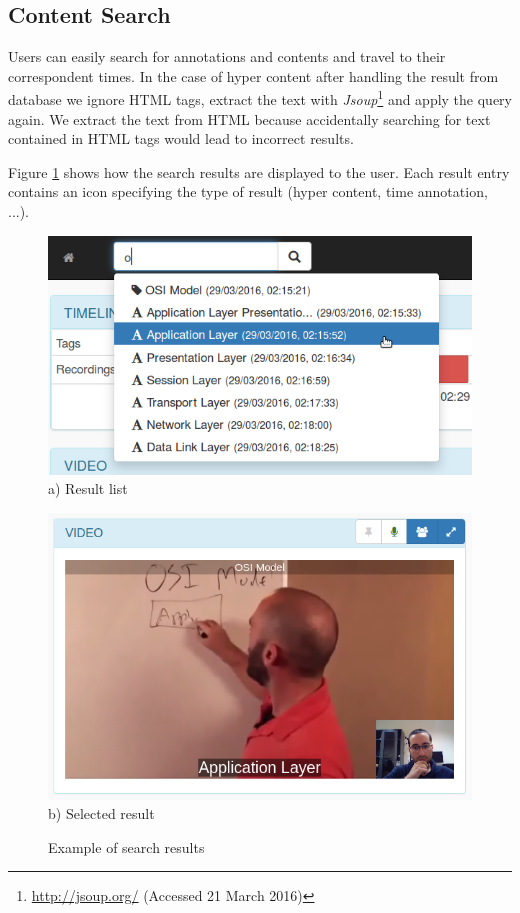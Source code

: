 	\subsection{Content Search}

	Users can easily search for annotations and contents and travel to their correspondent times. In the case of hyper content after handling the result from database we ignore \ac{HTML} tags, extract the text with \emph{Jsoup}\footnote{\url{http://jsoup.org/} (Accessed 21 March 2016)} and apply the query again. We extract the text from \ac{HTML} because accidentally searching for text contained in \ac{HTML} tags would lead to incorrect results.

	Figure \ref{fig:search} shows how the search results are displayed to the user. Each result entry contains an icon specifying the type of result (hyper content, time annotation, ...).




\begin{figure}[!htb]
	\centering
	\begin{minipage}[b]{0.45\linewidth}
		\centering
		\includegraphics[width=\textwidth]{figures/search.png}
		a) Result list
	\end{minipage}
	\quad
	\begin{minipage}[b]{0.30\linewidth}
		\centering
		\includegraphics[width=\textwidth]{figures/search2.png}
	    b) Selected result
	\end{minipage}
	\caption{Example of search results}
	\label{fig:search}
\end{figure}


